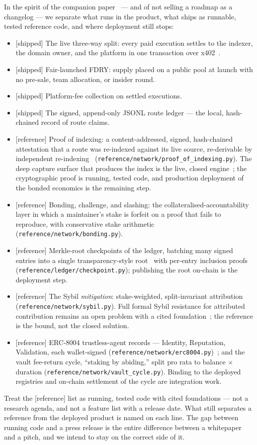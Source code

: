 \documentclass[11pt]{article}
\newcommand{\impl}{\textcolor{green!55!black}{\small[shipped]}}
\newcommand{\refimpl}{\textcolor{blue!70!black}{\small[reference]}}
\begin{document}
In the spirit of the companion paper~\cite{internalapis} --- and of not selling a
roadmap as a changelog --- we separate what runs in the product, what ships as
runnable, tested reference code, and where deployment still stops:
\begin{itemize}[leftmargin=1.4em]
\item \impl{} The live three-way split: every paid execution settles to the
indexer, the domain owner, and the platform in one transaction over
x402~\cite{x402}.
\item \impl{} Fair-launched FDRY: supply placed on a public pool at launch with no
pre-sale, team allocation, or insider round.
\item \impl{} Platform-fee collection on settled executions.
\item \impl{} The signed, append-only JSONL route ledger --- the local, hash-chained
record of route claims.
\item \refimpl{} Proof of indexing: a content-addressed, signed, hash-chained
attestation that a route was re-indexed against its live source, re-derivable by
independent re-indexing~\cite{thegraph,filecoin2017}
(\texttt{reference/network/\allowbreak proof\_of\_indexing.py}). The deep capture
surface that produces the index is the live, closed engine~\cite{ossnotice}; the
cryptographic proof is running, tested code, and production deployment of the bonded
economics is the remaining step.
\item \refimpl{} Bonding, challenge, and slashing: the collateralised-accountability
layer in which a maintainer's stake is forfeit on a proof that fails to reproduce,
with conservative stake arithmetic (\texttt{reference/network/bonding.py}).
\item \refimpl{} Merkle-root checkpoints of the ledger, batching many signed entries
into a single transparency-style root~\cite{rfc6962} with per-entry inclusion proofs
(\texttt{reference/ledger/checkpoint.py}); publishing the root on-chain is the
deployment step.
\item \refimpl{} The Sybil \emph{mitigation}: stake-weighted, split-invariant
attribution (\texttt{reference/network/sybil.py}). Full formal Sybil resistance for
attributed contribution remains an open problem with a cited
foundation~\cite{sybil}; the reference is the bound, not the closed solution.
\item \refimpl{} ERC-8004 trustless-agent records --- Identity, Reputation,
Validation, each wallet-signed (\texttt{reference/network/erc8004.py})~\cite{erc8004};
and the vault fee-return cycle, ``staking by abiding,'' split pro rata to
balance $\times$ duration (\texttt{reference/network/vault\_cycle.py}). Binding to
the deployed registries and on-chain settlement of the cycle are integration work.
\end{itemize}
Treat the \refimpl{} list as running, tested code with cited foundations --- not a
research agenda, and not a feature list with a release date. What still separates a
reference from the deployed product is named on each line. The gap between running
code and a press release is the entire difference between a whitepaper and a pitch,
and we intend to stay on the correct side of it.
\end{document}

